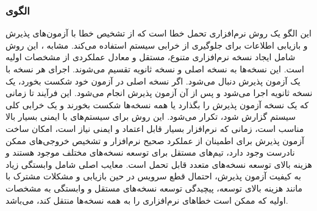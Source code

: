 \subsubsection{الگوی }
\label{ArmoushSWRecoverBlockSec}
\begin{RTL}
این الگو \cite{ref5} یک روش نرم‌افزاری تحمل خطا است که از تشخیص خطا
با آزمون‌های پذیرش و بازیابی اطلاعات برای جلوگیری از خرابی سیستم
استفاده می‌کند. مشابه ، این روش شامل ایجاد
 نسخه نرم‌افزاری متنوع، مستقل و معادل عملکردی
از مشخصات اولیه است. این نسخه‌ها به نسخه اصلی و 
نسخه ثانویه تقسیم می‌شوند. اجرای هر نسخه با یک
آزمون پذیرش دنبال می‌شود. اگر نسخه اصلی در آزمون خود شکست بخورد،
یک نسخه ثانویه  اجرا می‌شود
و پس از آن آزمون پذیرش انجام می‌شود. این فرآیند تا زمانی که
یک نسخه آزمون پذیرش را بگذارد یا همه نسخه‌ها شکست بخورند
و یک خرابی کلی سیستم گزارش شود، تکرار می‌شود.
این روش برای سیستم‌های با ایمنی بسیار بالا
مناسب است، زمانی که نرم‌افزار بسیار قابل اعتماد
و ایمنی نیاز است، امکان ساخت آزمون پذیرش برای اطمینان از
عملکرد صحیح نرم‌افزار و تشخیص خروجی‌های ممکن نادرست
وجود دارد، تیم‌های مستقل برای توسعه نسخه‌های مختلف موجود
هستند و هزینه بالای توسعه نسخه‌های متعدد قابل
تحمل است. معایب اصلی شامل وابستگی
زیاد به کیفیت آزمون پذیرش، احتمال قطع سرویس در
حین بازیابی و مشکلات مشترک با  مانند
هزینه بالای توسعه، پیچیدگی توسعه نسخه‌های مستقل و وابستگی به مشخصات
اولیه که ممکن است خطاهای نرم‌افزاری را به همه نسخه‌ها منتقل کند، می‌باشد.
\end{RTL}